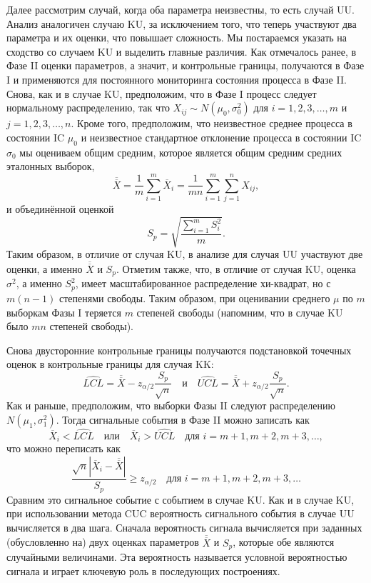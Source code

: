 Далее рассмотрим случай, когда оба параметра неизвестны, то есть случай UU. Анализ аналогичен случаю KU, за исключением того, что теперь участвуют два параметра и их оценки, что повышает сложность. Мы постараемся указать на сходство со случаем KU и выделить главные различия. Как отмечалось ранее, в Фазе II оценки параметров, а значит, и контрольные границы, получаются в Фазе I и применяются для постоянного мониторинга состояния процесса в Фазе II. Снова, как и в случае KU, предположим, что в Фазе I процесс следует нормальному распределению, так что \(X_{ij} \sim N(\mu_0, \sigma_0^2)\) для \(i = 1, 2, 3, \ldots, m\) и \(j = 1, 2, 3, \ldots, n\). Кроме того, предположим, что неизвестное среднее процесса в состоянии IC \(\mu_0\) и неизвестное стандартное отклонение процесса в состоянии IC \(\sigma_0\) мы оцениваем общим средним, которое является общим средним средних эталонных выборок,
\[
	\overline{\overline{X}} = \frac{1}{m}\sum_{i=1}^{m}\overline{X}_i
	= \frac{1}{mn}\sum_{i=1}^{m}\sum_{j=1}^{n} X_{ij},
\]
и объединённой оценкой
\[
	S_p = \sqrt{\frac{\sum_{i=1}^{m} S_i^2}{m}}.
\]
Таким образом, в отличие от случая KU, в анализе для случая UU участвуют две оценки, а именно \(\overline{\overline{X}}\) и \(S_p\). Отметим также, что, в отличие от случая KU, оценка \(\sigma^2\), а именно \(S_p^2\), имеет масштабированное распределение хи-квадрат, но с \(m(n - 1)\) степенями свободы. Таким образом, при оценивании среднего \(\mu\) по \(m\) выборкам Фазы I теряется \(m\) степеней свободы (напомним, что в случае KU было \(mn\) степеней свободы).

Снова двусторонние контрольные границы получаются подстановкой точечных оценок в контрольные границы для случая KK:
\[
	\widehat{LCL} = \overline{\overline{X}} - z_{\alpha/2}\frac{S_p}{\sqrt{n}}
	\quad\text{и}\quad
	\widehat{UCL} = \overline{\overline{X}} + z_{\alpha/2}\frac{S_p}{\sqrt{n}}.
\]
Как и раньше, предположим, что выборки Фазы II следуют распределению \(N(\mu_1, \sigma_1^2)\). Тогда сигнальные события в Фазе II можно записать как
\[
	\overline{X}_i < \widehat{LCL} \quad\text{или}\quad \overline{X}_i > \widehat{UCL}
	\quad\text{для } i = m + 1, m + 2, m + 3, \ldots,
\]
что можно переписать как
\[
	\frac{\sqrt{n}|\overline{X}_i - \overline{\overline{X}}|}{S_p} \ge z_{\alpha/2}
	\quad\text{для } i = m + 1, m + 2, m + 3, \ldots
\]
Сравним это сигнальное событие с событием в случае KU. Как и в случае KU, при использовании метода CUC вероятность сигнального события в случае UU вычисляется в два шага. Сначала вероятность сигнала вычисляется при заданных (обусловленно на) двух оценках параметров \(\overline{\overline{X}}\) и \(S_p\), которые обе являются случайными величинами. Эта вероятность называется условной вероятностью сигнала и играет ключевую роль в последующих построениях.

